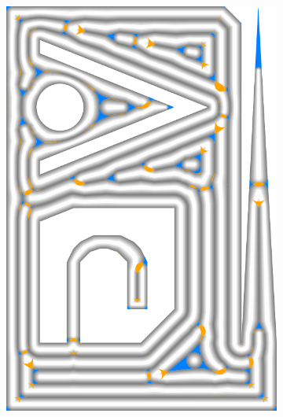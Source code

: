 \begin{figure}
\begin{subfigure}{\figwidth}
\includegraphics[width=\columnwidth]{sources-validation-gMAT-example-TEST-InwardDistributed-accuracy.png}

\end{subfigure}
\end{figure}
